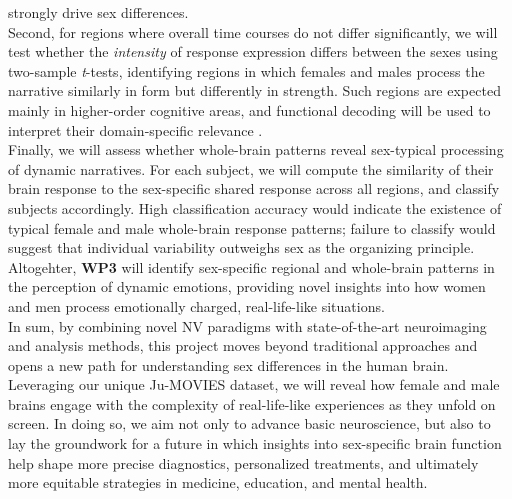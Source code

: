\documentclass[11pt,a4paper]{article}
\begin{document}
strongly drive sex differences.\\
Second, for regions where overall time courses do not differ significantly, we will test whether the \textit{intensity} of 
response expression differs between the sexes using two-sample \textit{t}-tests, identifying regions in which 
females and males process the narrative similarly in form but differently in strength. 
Such regions are expected mainly in higher-order cognitive areas, and functional decoding will be
used to interpret their domain-specific relevance \parencite{foxMetaanalysisHumanNeuroimaging2014a}.\\  
Finally, we will assess whether whole-brain patterns reveal sex-typical processing of dynamic narratives. 
For each subject, we will compute the similarity of their brain response to the sex-specific shared response 
across all regions, and classify subjects accordingly. High classification accuracy would indicate 
the existence of typical female and male whole-brain response patterns; failure to classify would 
suggest that individual variability outweighs sex as the organizing principle.\\
Altogehter, \textbf{WP3} will identify sex-specific regional and whole-brain patterns in the perception of 
dynamic emotions, providing novel insights into how women and men process emotionally charged, 
real-life-like situations.\\  
[6pt]
In sum, by combining novel NV paradigms with state-of-the-art neuroimaging and analysis methods, 
this project moves beyond traditional approaches and opens a new path for understanding sex differences 
in the human brain. Leveraging our unique Ju-MOVIES dataset, we will reveal how female and male brains engage 
with the complexity of real-life-like experiences as they unfold on screen.
In doing so, we aim not only to advance basic neuroscience, 
but also to lay the groundwork for a future in which insights into sex-specific brain 
function help shape more precise diagnostics, personalized treatments, and ultimately more equitable 
strategies in medicine, education, and mental health.

\printbibliography
\end{document}
